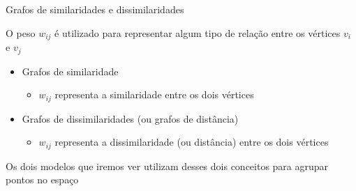 \documentclass[11pt]{beamer}
\begin{document}
\begin{frame}{Grafos de similaridades e dissimilaridades}

O peso $w_{ij}$ é utilizado para representar algum tipo de relação entre os vértices $v_i$ e $v_j$

\begin{itemize}

\vspace{0.5cm}

\item Grafos de similaridade

\begin{itemize}

\item $w_{ij}$ representa a similaridade entre os dois vértices

\end{itemize}
\vspace{0.5cm}
\item Grafos de dissimilaridades (ou grafos de distância)

\begin{itemize}

\item $w_{ij}$ representa a dissimilaridade (ou distância) entre os dois vértices

\end{itemize}
\end{itemize}

\vspace{0.5cm}

Os dois modelos que iremos ver utilizam desses dois conceitos para agrupar pontos no espaço

\end{frame}
\end{document}
